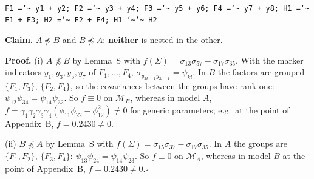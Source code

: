 \documentclass[10pt,a4paper]{article}
\newcommand{\nnest}{\not\preceq}
\begin{document}
\begin{minipage}[t]{0.49\textwidth}
\\[1pt]{\scriptsize \texttt{F1 =\char`\~{} y1 + y2; F2 =\char`\~{} y3 + y4; F3 =\char`\~{} y5 + y6; F4 =\char`\~{} y7 + y8; H1 =\char`\~{} F1 + F3; H2 =\char`\~{} F2 + F4; H1 \char`\~{}\char`\~{} H2}}\end{minipage}
\par\bigskip
\noindent\textbf{Claim.} $A \nnest B$ and $B \nnest A$: \textbf{neither} is nested in the other.\par\smallskip
\noindent\textbf{Proof.} (i) $A\nnest B$ by Lemma~S with $f(\Sigma)=\sigma_{13}\sigma_{57} - \sigma_{17}\sigma_{35}$. With the marker indicators $y_1,y_3,y_5,y_7$ of $F_1,\dots,F_4$, $\sigma_{y_{2k-1}y_{2l-1}}=\psi_{kl}$. In $B$ the factors are grouped $\{F_1,F_3\}$, $\{F_2,F_4\}$, so the covariances between the groups have rank one: $\psi_{12}\psi_{34}=\psi_{14}\psi_{32}$. So $f\equiv0$ on $\mathcal M_B$, whereas in model $A$, $f=\gamma_1\gamma_2\gamma_3\gamma_4(\phi_{11}\phi_{22}-\phi_{12}^2)\neq0$ for generic parameters; e.g.\ at the point of Appendix~B, $f=0.2430\neq0$.\par\smallskip
\noindent(ii) $B\nnest A$ by Lemma~S with $f(\Sigma)=\sigma_{15}\sigma_{37} - \sigma_{17}\sigma_{35}$. In $A$ the groups are $\{F_1,F_2\}$, $\{F_3,F_4\}$: $\psi_{13}\psi_{24}=\psi_{14}\psi_{23}$. So $f\equiv0$ on $\mathcal M_A$, whereas in model $B$ at the point of Appendix~B, $f=0.2430\neq0$.\hfill$\square$\par\medskip
{}

\clearpage
\end{document}
